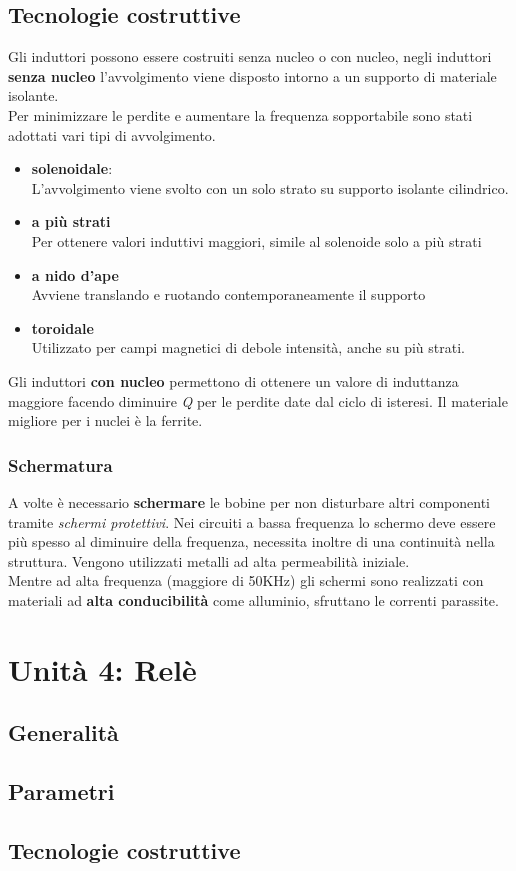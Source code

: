 \documentclass{article}
\begin{document}
\subsection{Tecnologie costruttive}
Gli induttori possono essere costruiti senza nucleo o con nucleo,
negli induttori \textbf{senza nucleo} l'avvolgimento viene disposto intorno a un supporto di materiale isolante.\\
Per minimizzare le perdite e aumentare la frequenza sopportabile sono stati adottati vari tipi di avvolgimento.
\begin{itemize}
    \item \textbf{solenoidale}:\\
    L'avvolgimento viene svolto con un solo strato su supporto isolante cilindrico.
    \item \textbf{a più strati} \\
    Per ottenere valori induttivi maggiori, simile al solenoide solo a più strati
    \item \textbf{a nido d'ape} \\
    Avviene translando e ruotando contemporaneamente il supporto 
    \item \textbf{toroidale}\\
    Utilizzato per campi magnetici di debole intensità, anche su più strati.
\end{itemize}
Gli induttori \textbf{con nucleo} permettono di ottenere un valore di induttanza maggiore facendo diminuire \emph{Q} per le perdite date dal ciclo di isteresi.
Il materiale migliore per i nuclei è la ferrite.
\subsubsection{Schermatura}
A volte è necessario \textbf{schermare} le bobine per non disturbare altri componenti tramite \textit{schermi protettivi}.
Nei circuiti a bassa frequenza lo schermo deve essere più spesso al diminuire della frequenza, necessita inoltre di una continuità nella struttura. Vengono utilizzati metalli ad alta permeabilità iniziale.\\
Mentre ad alta frequenza (maggiore di 50KHz) gli schermi sono realizzati con materiali ad \textbf{alta conducibilità} come alluminio, sfruttano le correnti parassite.
\section{Unità 4: Relè}
\subsection{Generalità}
\subsection{Parametri}
\subsection{Tecnologie costruttive}
\end{document}

